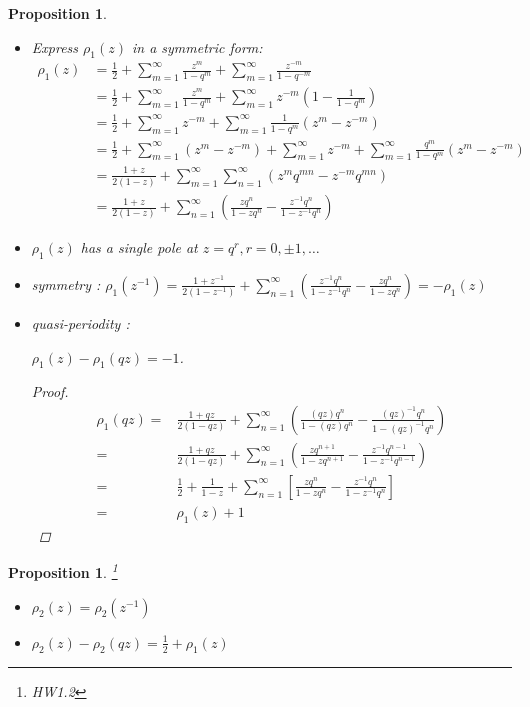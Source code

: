 \documentclass{article}
\newtheorem{Prop}[Thm]{Proposition}
\begin{document}
\begin{Prop}

\begin{itemize}
\item
Express $\rho_1(z)$ in a symmetric form:
 \begin{align*}
 \rho_1(z) &= \frac{1}{2} + \sum\limits_{m=1}^{\infty}\frac{z^m}{1-q^m} + \sum\limits_{m=1}^{\infty} \frac{z^{-m}}{1-q^{-m}}\\
           &= \frac{1}{2} + \sum\limits_{m=1}^{\infty}\frac{z^m}{1-q^m} + \sum\limits_{m=1}^{\infty}z^{-m}(1- \frac{1}{1-q^m}) \\
           &= \frac{1}{2} + \sum\limits_{m=1}^{\infty}z^{-m} + \sum\limits_{m=1}^{\infty} \frac{1}{1-q^m}(z^m-z^{-m})\\
           &= \frac{1}{2} + \sum\limits_{m=1}^{\infty} (z^m-z^{-m}) + \sum\limits_{m=1}^{\infty}z^{-m} + \sum\limits_{m=1}^{\infty} \frac{q^m}{1-q^m}(z^m-z^{-m})\\
           &= \frac{1+z}{2(1-z)} + \sum\limits_{m=1}^{\infty}\sum\limits_{n=1}^{\infty}(z^mq^{mn}-z^{-m}q^{mn})\\
 &= \frac{1+z}{2(1-z)} + \sum\limits_{n=1}^{\infty} \left( \frac{zq^n}{1-zq^n} - \frac{z^{-1}q^n}{1-z^{-1}q^{n}} \right)
\end{align*}  
\item $\rho_1(z)$ has a single pole at $z=q^r, r= 0, \pm 1,\dots$
\item symmetry : 
$\rho_1(z^{-1})= \frac{1+z^{-1}}{2(1-z^{-1})} + \sum\limits_{n=1}^{\infty}\left( \frac{z^{-1}q^n}{1-z^{-1}q^n} - \frac{zq^n}{1-zq^n} \right) = - \rho_1(z)$
\item quasi-periodity :

$\rho_1(z)- \rho_1(qz)= -1$.
\begin{proof}

\begin{align*}
 \rho_1(qz)=& \frac{1+qz}{2(1-qz)} + \sum\limits_{n=1}^{\infty} \left( \frac{(qz)q^n}{1-(qz)q^{n}} - \frac{(qz)^{-1}q^n}{1-(qz)^{-1}q^n} \right)\\
 =&\frac{1+qz}{2(1-qz)} + \sum\limits_{n=1}^{\infty} \left( \frac{zq^{n+1}}{1-zq^{n+1}}- \frac{z^{-1}q^{n-1}}{1-z^{-1}q^{n-1}} \right)\\
 =& \frac{1}{2} + \frac{1}{1-z} + \sum\limits_{n=1}^{\infty} \left[\frac{zq^n}{1-zq^n} - \frac{z^{-1}q^n}{1-z^{-1}q^n} \right]\\
 =&\rho_1(z)+1
\end{align*}

\end{proof}
\end{itemize}
\end{Prop}
\begin{Prop}\footnote{HW1.2}
\begin{itemize}
\item $\rho_2(z)=\rho_2(z^{-1})$
\item $\rho_2(z)-\rho_2(qz)= \frac{1}{2}  + \rho_1(z)$
\end{itemize}
\end{Prop}
\end{document}
